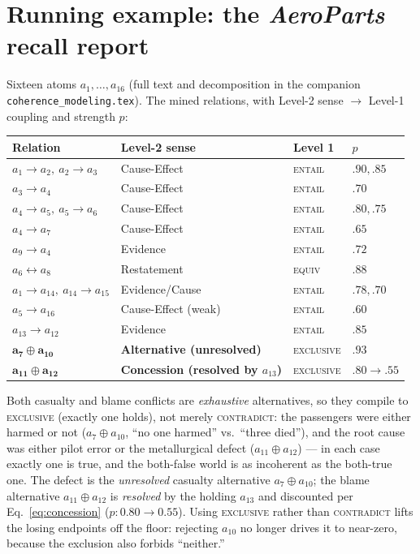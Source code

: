 \documentclass[11pt]{article}
\begin{document}
\section{Running example: the \emph{AeroParts} recall report}
\label{sec:example}

Sixteen atoms $a_1,\dots,a_{16}$ (full text and decomposition in the companion
\texttt{coherence\_modeling.tex}). The mined relations, with Level-2 sense $\to$ Level-1
coupling and strength $p$:

\begin{center}\small
\begin{tabular}{@{}llll@{}}
\toprule
\textbf{Relation} & \textbf{Level-2 sense} & \textbf{Level 1} & \textbf{$p$}\\
\midrule
$a_1\!\to\!a_2,\ a_2\!\to\!a_3$ & Cause-Effect & \textsc{entail} & $.90,.85$\\
$a_3\!\to\!a_4$ & Cause-Effect & \textsc{entail} & $.70$\\
$a_4\!\to\!a_5,\ a_5\!\to\!a_6$ & Cause-Effect & \textsc{entail} & $.80,.75$\\
$a_4\!\to\!a_7$ & Cause-Effect & \textsc{entail} & $.65$\\
$a_9\!\to\!a_4$ & Evidence & \textsc{entail} & $.72$\\
$a_6\!\leftrightarrow\!a_8$ & Restatement & \textsc{equiv} & $.88$\\
$a_1\!\to\!a_{14},\ a_{14}\!\to\!a_{15}$ & Evidence/Cause & \textsc{entail} & $.78,.70$\\
$a_5\!\to\!a_{16}$ & Cause-Effect (weak) & \textsc{entail} & $.60$\\
$a_{13}\!\to\!a_{12}$ & Evidence & \textsc{entail} & $.85$\\
$\mathbf{a_7\!\oplus\!a_{10}}$ & \textbf{Alternative (unresolved)} & \textsc{exclusive} & $\mathbf{.93}$\\
$\mathbf{a_{11}\!\oplus\!a_{12}}$ & \textbf{Concession (resolved by $a_{13}$)} & \textsc{exclusive} & $.80\!\to\!.55$\\
\bottomrule
\end{tabular}
\end{center}

Both casualty and blame conflicts are \emph{exhaustive} alternatives, so they compile to
\textsc{exclusive} (exactly one holds), not merely \textsc{contradict}: the passengers were
either harmed or not ($a_7\!\oplus\!a_{10}$, ``no one harmed'' vs.\ ``three died''), and the
root cause was either pilot error or the metallurgical defect ($a_{11}\!\oplus\!a_{12}$) ---
in each case exactly one is true, and the both-false world is as incoherent as the both-true
one. The defect is the \emph{unresolved} casualty alternative $a_7\!\oplus\!a_{10}$; the blame
alternative $a_{11}\!\oplus\!a_{12}$ is \emph{resolved} by the holding $a_{13}$ and discounted
per Eq.~\eqref{eq:concession} ($p:0.80\!\to\!0.55$). Using \textsc{exclusive} rather than
\textsc{contradict} lifts the losing endpoints off the floor: rejecting $a_{10}$ no longer
drives it to near-zero, because the exclusion also forbids ``neither.''
\end{document}
